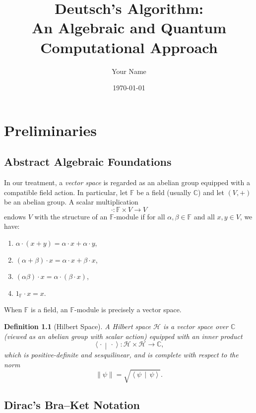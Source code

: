\documentclass[11pt,oneside]{book}
\newtheorem{definition}{Definition}[chapter]
\theoremstyle{remark}
\renewcommand{\braket}[2]{\left\langle#1\,\middle|\,#2\right\rangle}
\begin{document}
	
	\frontmatter
	\title{Deutsch's Algorithm:\\ An Algebraic and Quantum Computational Approach}
	\author{Your Name}
	\date{\today}
	\maketitle
	\tableofcontents
	
	\mainmatter
	
	\chapter{Preliminaries}
	\section{Abstract Algebraic Foundations}
	
	In our treatment, a \emph{vector space} is regarded as an abelian group equipped with a compatible field action. In particular, let $\mathbb{F}$ be a field (usually $\mathbb{C}$) and let $(V,+)$ be an abelian group. A scalar multiplication
	\[
	\cdot : \mathbb{F} \times V \to V
	\]
	endows $V$ with the structure of an $\mathbb{F}$-module if for all $\alpha,\beta\in\mathbb{F}$ and all $x,y\in V$, we have:
	\begin{enumerate}[label=(\roman*)]
		\item $\alpha\cdot (x+y)=\alpha\cdot x+\alpha\cdot y$,
		\item $(\alpha+\beta)\cdot x=\alpha\cdot x+\beta\cdot x$,
		\item $(\alpha\beta)\cdot x=\alpha\cdot (\beta\cdot x)$,
		\item $1_{\mathbb{F}}\cdot x=x$.
	\end{enumerate}
	When $\mathbb{F}$ is a field, an $\mathbb{F}$-module is precisely a vector space.
	
	\begin{definition}[Hilbert Space]
		A \emph{Hilbert space} $\mathcal{H}$ is a vector space over $\mathbb{C}$ (viewed as an abelian group with scalar action) equipped with an inner product
		\[
		\braket{\cdot}{\cdot} : \mathcal{H}\times \mathcal{H} \to \mathbb{C},
		\]
		which is positive-definite and sesquilinear, and is complete with respect to the norm
		\[
		\|\psi\|=\sqrt{\braket{\psi}{\psi}}.
		\]
	\end{definition}
	
	\section{Dirac's Bra--Ket Notation}
	
\end{document}
